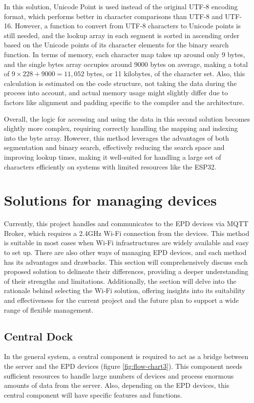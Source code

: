 \documentclass[../Main.tex]{subfiles}
\begin{document}
In this solution, Unicode Point is used instead of the original UTF-8 encoding format, which performs better in character comparisons than UTF-8 and UTF-16. However, a function to convert from UTF-8 characters to Unicode points is still needed, and the lookup array in each segment is sorted in ascending order based on the Unicode points of its character elements for the binary search function. In terms of memory, each character map takes up around only 9 bytes, and the single bytes array occupies around 9000 bytes on average, making a total of \(9\times228+9000=11,052\) bytes, or 11 kilobytes, of the character set. Also, this calculation is estimated on the code structure, not taking the data during the process into account, and actual memory usage might slightly differ due to factors like alignment and padding specific to the compiler and the architecture.

Overall, the logic for accessing and using the data in this second solution becomes slightly more complex, requiring correctly handling the mapping and indexing into the byte array. However, this method leverages the advantages of both segmentation and binary search, effectively reducing the search space and improving lookup times, making it well-suited for handling a large set of characters efficiently on systems with limited resources like the ESP32.

\section{Solutions for managing devices}
Currently, this project handles and communicates to the \gls{EPD} devices via MQTT Broker, which requires a 2.4GHz Wi-Fi connection from the devices. This method is suitable in most cases when Wi-Fi infrastructures are widely available and easy to set up. There are also other ways of managing \gls{EPD} devices, and each method has its advantages and drawbacks. This section will comprehensively discuss each proposed solution to delineate their differences, providing a deeper understanding of their strengths and limitations. Additionally, the section will delve into the rationale behind selecting the Wi-Fi solution, offering insights into its suitability and effectiveness for the current project and the future plan to support a wide range of flexible management.

\subsection{Central Dock}
In the general system, a central component is required to act as a bridge between the server and the \gls{EPD} devices (figure \ref{fig:flow-chart3}). This component needs sufficient resources to handle large numbers of devices and process enormous amounts of data from the server. Also, depending on the \gls{EPD} devices, this central component will have specific features and functions.
\end{document}
